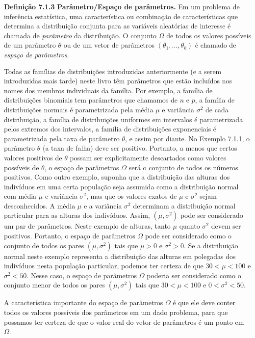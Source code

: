 \vspace{1cm}
\noindent\textbf{Definição 7.1.3} \quad \textbf{Parâmetro/Espaço de parâmetros.} Em um problema de inferência estatística, uma característica ou combinação de características que determina a distribuição conjunta para as variáveis aleatórias de interesse é chamada de \textit{parâmetro} da distribuição. O conjunto $\Omega$ de todos os valores possíveis de um parâmetro $\theta$ ou de um vetor de parâmetros $(\theta_1, \dots, \theta_k)$ é chamado de \textit{espaço de parâmetros}.

\vspace{1cm}
Todas as famílias de distribuições introduzidas anteriormente (e a serem introduzidas mais tarde) neste livro têm parâmetros que estão incluídos nos nomes dos membros individuais da família. Por exemplo, a família de distribuições binomiais tem parâmetros que chamamos de $n$ e $p$, a família de distribuições normais é parametrizada pela média $\mu$ e variância $\sigma^2$ de cada distribuição, a família de distribuições uniformes em intervalos é parametrizada pelos extremos dos intervalos, a família de distribuições exponenciais é parametrizada pela taxa de parâmetro $\theta$, e assim por diante. No Exemplo 7.1.1, o parâmetro $\theta$ (a taxa de falha) deve ser positivo. Portanto, a menos que certos valores positivos de $\theta$ possam ser explicitamente descartados como valores possíveis de $\theta$, o espaço de parâmetros $\Omega$ será o conjunto de todos os números positivos. Como outro exemplo, suponha que a distribuição das alturas dos indivíduos em uma certa população seja assumida como a distribuição normal com média $\mu$ e variância $\sigma^2$, mas que os valores exatos de $\mu$ e $\sigma^2$ sejam desconhecidos. A média $\mu$ e a variância $\sigma^2$ determinam a distribuição normal particular para as alturas dos indivíduos. Assim, $(\mu, \sigma^2)$ pode ser considerado um par de parâmetros. Neste exemplo de alturas, tanto $\mu$ quanto $\sigma^2$ devem ser positivos. Portanto, o espaço de parâmetros $\Omega$ pode ser considerado como o conjunto de todos os pares $(\mu, \sigma^2)$ tais que $\mu > 0$ e $\sigma^2 > 0$. Se a distribuição normal neste exemplo representa a distribuição das alturas em polegadas dos indivíduos nesta população particular, podemos ter certeza de que $30 < \mu < 100$ e $\sigma^2 < 50$. Nesse caso, o espaço de parâmetros $\Omega$ poderia ser considerado como o conjunto menor de todos os pares $(\mu, \sigma^2)$ tais que $30 < \mu < 100$ e $0 < \sigma^2 < 50$.

A característica importante do espaço de parâmetros $\Omega$ é que ele deve conter todos os valores possíveis dos parâmetros em um dado problema, para que possamos ter certeza de que o valor real do vetor de parâmetros é um ponto em $\Omega$.

